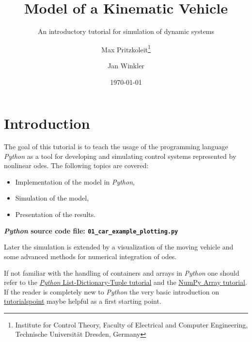 \documentclass[a4paper,11pt,headinclude=true,headsepline,parskip=half,DIV=13]{scrartcl}
\title{Model of a Kinematic Vehicle}
\subtitle{An introductory tutorial for simulation of dynamic systems}
\author{Max Pritzkoleit\thanks{Institute for Control Theory, Faculty of Electrical and Computer Engineering, Technische Universität Dresden, Germany} \and Jan Winkler\footnotemark[1]}
\date{\today}
\newcommand{\py}{\emph{Python}\xspace}
\begin{document}
\maketitle




\tableofcontents

\newpage

\section{Introduction}
The goal of this tutorial is to teach the usage of the programming language \py as a tool for developing and simulating control systems  represented by nonlinear \glspl{ode}. The following topics are covered:
\begin{itemize}
\item Implementation of the model in \py,
\item Simulation of the model,
\item Presentation of the results.
\end{itemize}
\textbf{\py source code file: \texttt{01\_car\_example\_plotting.py}}

Later the simulation is extended by a visualization of the moving vehicle and some advanced methods for numerical integration of \glspl{ode}.

If not familiar with the handling of containers and arrays in \py one should refer to the \href{http://cs231n.github.io/python-numpy-tutorial/#python-containers}{\py List-Dictionary-Tuple tutorial} and the \href{http://cs231n.github.io/python-numpy-tutorial/#numpy}{NumPy Array tutorial}. If the reader is completely new to \py the very basic introduction on \href{https://www.tutorialspoint.com/python/index.htm}{tutorialspoint} maybe helpful as a first starting point.
\end{document}
